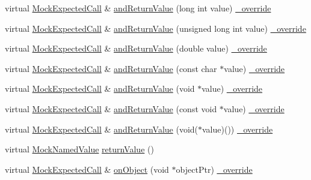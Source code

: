 \begin{DoxyCompactItemize}
\item 
virtual \hyperlink{class_mock_expected_call}{Mock\+Expected\+Call} \& \hyperlink{class_mock_checked_expected_call_ab66754505a335a2472e3f56fd97a0f26}{and\+Return\+Value} (long int value) \hyperlink{_cpp_u_test_config_8h_a049bea15dd750e15869863c94c1efc3b}{\+\_\+override}
\item 
virtual \hyperlink{class_mock_expected_call}{Mock\+Expected\+Call} \& \hyperlink{class_mock_checked_expected_call_a1e0fc04cbee3daeda422dfc66e938588}{and\+Return\+Value} (unsigned long int value) \hyperlink{_cpp_u_test_config_8h_a049bea15dd750e15869863c94c1efc3b}{\+\_\+override}
\item 
virtual \hyperlink{class_mock_expected_call}{Mock\+Expected\+Call} \& \hyperlink{class_mock_checked_expected_call_af0222bef246f6109d4aec64a6a703020}{and\+Return\+Value} (double value) \hyperlink{_cpp_u_test_config_8h_a049bea15dd750e15869863c94c1efc3b}{\+\_\+override}
\item 
virtual \hyperlink{class_mock_expected_call}{Mock\+Expected\+Call} \& \hyperlink{class_mock_checked_expected_call_a189034d88028fa407fe35118cbdc0792}{and\+Return\+Value} (const char $\ast$value) \hyperlink{_cpp_u_test_config_8h_a049bea15dd750e15869863c94c1efc3b}{\+\_\+override}
\item 
virtual \hyperlink{class_mock_expected_call}{Mock\+Expected\+Call} \& \hyperlink{class_mock_checked_expected_call_a39e510e812f80958ae95c5fe7f26bb7c}{and\+Return\+Value} (void $\ast$value) \hyperlink{_cpp_u_test_config_8h_a049bea15dd750e15869863c94c1efc3b}{\+\_\+override}
\item 
virtual \hyperlink{class_mock_expected_call}{Mock\+Expected\+Call} \& \hyperlink{class_mock_checked_expected_call_a9957e830f2f508b6ae9041043c4e08c7}{and\+Return\+Value} (const void $\ast$value) \hyperlink{_cpp_u_test_config_8h_a049bea15dd750e15869863c94c1efc3b}{\+\_\+override}
\item 
virtual \hyperlink{class_mock_expected_call}{Mock\+Expected\+Call} \& \hyperlink{class_mock_checked_expected_call_ab39bca67e06a448130ff59714349f4d7}{and\+Return\+Value} (void($\ast$value)()) \hyperlink{_cpp_u_test_config_8h_a049bea15dd750e15869863c94c1efc3b}{\+\_\+override}
\item 
virtual \hyperlink{class_mock_named_value}{Mock\+Named\+Value} \hyperlink{class_mock_checked_expected_call_a1afc0a670963abd85b5d7f7c8af305a4}{return\+Value} ()
\item 
virtual \hyperlink{class_mock_expected_call}{Mock\+Expected\+Call} \& \hyperlink{class_mock_checked_expected_call_a2b9a20c28455a98ea715a134776332fe}{on\+Object} (void $\ast$object\+Ptr) \hyperlink{_cpp_u_test_config_8h_a049bea15dd750e15869863c94c1efc3b}{\+\_\+override}

\end{DoxyCompactItemize}
